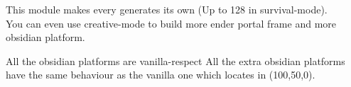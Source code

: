 
This module makes every  generates its own  (Up to 128 in survival-mode).\\
You can even use creative-mode to build more ender portal frame and more obsidian platform.

\begin{note}{All the obsidian platforms are vanilla-respect}
    All the extra obsidian platforms have the same behaviour as the vanilla one which locates in (100,50,0).
\end{note}

